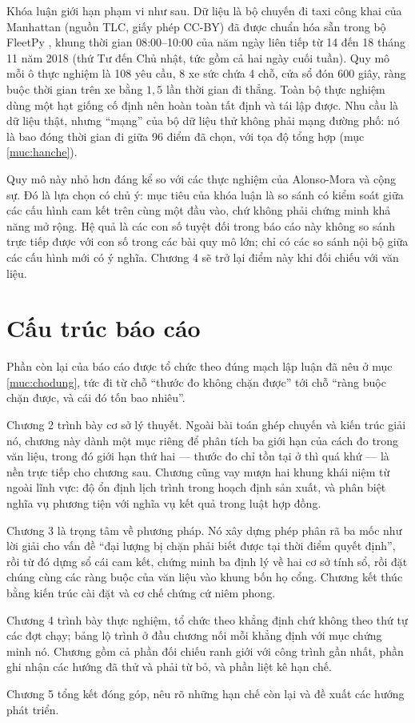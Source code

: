 Khóa luận giới hạn phạm vi như sau. Dữ liệu là bộ chuyến đi taxi công khai của Manhattan
(nguồn TLC, giấy phép CC-BY) đã được chuẩn hóa sẵn trong bộ FleetPy \cite{fleetpy2022}, khung
thời gian 08:00--10:00 của năm ngày liên tiếp từ 14 đến 18 tháng 11 năm 2018 (thứ Tư đến Chủ nhật,
tức gồm cả hai ngày cuối tuần). Quy mô mỗi ô thực
nghiệm là 108 yêu cầu, 8 xe sức chứa 4 chỗ, cửa sổ đón 600 giây, ràng buộc thời gian trên xe
bằng $1{,}5$ lần thời gian đi thẳng. Toàn bộ thực nghiệm dùng một hạt giống cố định nên hoàn
toàn tất định và tái lập được. Nhu cầu là dữ liệu thật, nhưng ``mạng'' của bộ dữ liệu thử không
phải mạng đường phố: nó là bao đóng thời gian đi giữa 96 điểm đã chọn, với tọa độ tổng hợp (mục
\ref{muc:hanche}).

Quy mô này nhỏ hơn đáng kể so với các thực nghiệm của Alonso-Mora và cộng sự. Đó là lựa chọn
có chủ ý: mục tiêu của khóa luận là so sánh có kiểm soát giữa các cấu hình cam kết trên cùng
một đầu vào, chứ không phải chứng minh khả năng mở rộng. Hệ quả là các con số tuyệt đối trong
báo cáo này không so sánh trực tiếp được với con số trong các bài quy mô lớn; chỉ có các so
sánh nội bộ giữa các cấu hình mới có ý nghĩa. Chương 4 sẽ trở lại điểm này khi đối chiếu với
văn liệu.

\section{Cấu trúc báo cáo}

Phần còn lại của báo cáo được tổ chức theo đúng mạch lập luận đã nêu ở mục \ref{muc:chodung},
tức đi từ chỗ
``thước đo không chặn được'' tới chỗ ``ràng buộc chặn được, và cái đó tốn bao nhiêu''.

Chương 2 trình bày cơ sở lý thuyết. Ngoài bài toán ghép chuyến và kiến trúc giải nó, chương này
dành một mục riêng để phân tích ba giới hạn của cách đo trong văn liệu, trong đó giới hạn thứ
hai --- thước đo chỉ tồn tại ở thì quá khứ --- là nền trực tiếp cho chương sau. Chương cũng vay
mượn hai khung khái niệm từ ngoài lĩnh vực: độ ổn định lịch trình trong hoạch định sản xuất, và
phân biệt nghĩa vụ phương tiện với nghĩa vụ kết quả trong luật hợp đồng.

Chương 3 là trọng tâm về phương pháp. Nó xây dựng phép phân rã ba mốc như lời giải cho vấn đề
``đại lượng bị chặn phải biết được tại thời điểm quyết định'', rồi từ đó dựng sổ cái cam kết,
chứng minh ba định lý về hai cơ sở tính sổ, rồi đặt chúng cùng các ràng buộc của văn liệu vào
khung bốn họ cổng. Chương kết thúc bằng kiến trúc cài đặt và cơ chế chứng cứ niêm phong.

Chương 4 trình bày thực nghiệm, tổ chức theo khẳng định chứ không theo thứ tự các đợt chạy;
bảng lộ trình ở đầu chương nối mỗi khẳng định với mục chứng minh nó. Chương gồm cả phần đối
chiếu ranh giới với công trình gần nhất, phần ghi nhận các hướng đã thử và phải từ bỏ, và phần
liệt kê hạn chế.

Chương 5 tổng kết đóng góp, nêu rõ những hạn chế còn lại và đề xuất các hướng phát triển.
